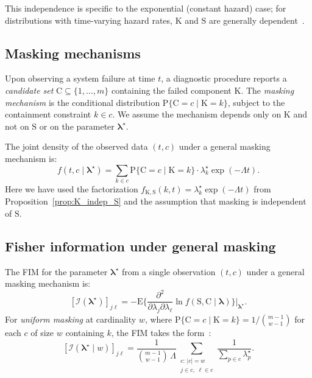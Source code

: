 \documentclass[preprint,12pt]{elsarticle}
\newcommand{\RV}[1]{\mathrm{#1}}
\newcommand{\Prob}[1]{\mathrm{P}\{#1\}}
\newcommand{\Expect}[1]{\mathrm{E}\{#1\}}
\newcommand{\sv}{\RV{S}}           %
\newcommand{\cand}{\RV{C}}         %
\newcommand{\tparam}[1]{{#1}^{\star}}  %
\newcommand{\infomatrx}{\mathcal{I}}
\newcommand{\pdf}{f}
\renewcommand{\vec}[1]{\boldsymbol{#1}}
\theoremstyle{definition}
\theoremstyle{remark}
\begin{document}
This independence is specific to the exponential (constant hazard) case; for
distributions with time-varying hazard rates, $\RV{K}$ and $\sv$ are generally
dependent~\cite{cox1959}.

\subsection{Masking mechanisms}

Upon observing a system failure at time $t$, a diagnostic procedure reports a
\emph{candidate set} $\cand \subseteq \{1,\ldots,m\}$ containing the failed
component $\RV{K}$. The \emph{masking mechanism} is the conditional distribution
$\Prob{\cand = c \mid \RV{K} = k}$, subject to the containment constraint
$k \in c$. We assume the mechanism depends only on $\RV{K}$ and not on $\sv$ or
on the parameter $\tparam{\vec\lambda}$.

The joint density of the observed data $(t, c)$ under a general masking
mechanism is:
\begin{equation}
\label{eq:general_joint_expanded}
\pdf(t, c \mid \tparam{\vec\lambda})
  = \sum_{k \in c} \Prob{\cand = c \mid \RV{K} = k} \cdot \tparam{\lambda}_k \exp(-\Lambda t).
\end{equation}
Here we have used the factorization
$\pdf_{\RV{K},\sv}(k,t) = \tparam{\lambda}_k \exp(-\Lambda t)$ from
Proposition~\ref{prop:K_indep_S} and the assumption that masking is independent
of $\sv$.

\subsection{Fisher information under general masking}

The FIM for the parameter $\tparam{\vec\lambda}$ from a single observation
$(t, c)$ under a general masking mechanism is:
\begin{equation}
\label{eq:general_fim}
[\infomatrx(\tparam{\vec\lambda})]_{j\ell}
  = - \Expect{\frac{\partial^2}{\partial \lambda_j \partial \lambda_\ell}
    \ln \pdf(\sv, \cand \mid \vec\lambda)}\bigg|_{\tparam{\vec\lambda}}.
\end{equation}
For \emph{uniform masking} at cardinality $w$, where
$\Prob{\cand = c \mid \RV{K} = k} = 1/\binom{m-1}{w-1}$ for each $c$ of size
$w$ containing $k$, the FIM takes the form~\cite{towell2025expo}:
\begin{equation}
\label{eq:uniform_fim}
[\infomatrx(\tparam{\vec\lambda} \mid w)]_{j\ell}
  = \frac{1}{\binom{m-1}{w-1}\,\Lambda}
    \sum_{\substack{c:\,|c|=w \\ j \in c,\; \ell \in c}}
    \frac{1}{\sum_{p \in c} \tparam{\lambda}_p}.
\end{equation}
\end{document}
